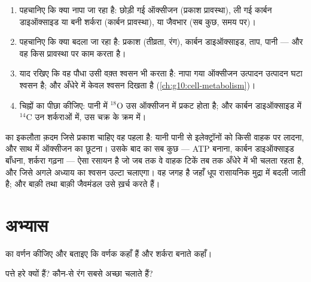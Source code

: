 \begin{method}[किसी प्रकाशसंश्लेषण प्रयोग पर तर्क करना]\label{met:g12:photosynthesis:experiment}
\begin{enumerate}
  \item पहचानिए कि क्या नापा जा रहा है: छोड़ी गई ऑक्सीजन (प्रकाश प्रावस्था),
        ली गई कार्बन डाइऑक्साइड या बनी शर्करा (कार्बन प्रावस्था), या
        जैवभार (सब कुछ, समय पर)।
  \item पहचानिए कि क्या बदला जा रहा है: प्रकाश (तीव्रता, रंग), कार्बन
        डाइऑक्साइड, ताप, पानी --- और वह किस प्रावस्था पर काम करता है।
  \item याद रखिए कि वह पौधा उसी वक़्त श्वसन भी करता है: नापा गया ऑक्सीजन
        उत्पादन उत्पादन घटा श्वसन है; और अँधेरे में केवल श्वसन दिखता है
        (\cref{ch:g10:cell-metabolism})।
  \item चिह्नों का पीछा कीजिए: पानी में $^{18}$O उस ऑक्सीजन में प्रकट होता
        है; और कार्बन डाइऑक्साइड में $^{14}$C उन शर्कराओं में, उस चक्र के
        क्रम में।
\end{enumerate}
\end{method}

\begin{remark}[प्रकाश, और फिर रसायन]\label{rem:g12:photosynthesis:light}
 का इकलौता क़दम जिसे प्रकाश चाहिए वह पहला है: यानी पानी से
इलेक्ट्रॉनों को किसी वाहक पर लादना, और साथ में ऑक्सीजन का छूटना। उसके बाद
का सब कुछ --- ATP बनाना, कार्बन डाइऑक्साइड बाँधना, शर्करा गढ़ना --- ऐसा
रसायन है जो जब तक वे वाहक टिकें तब तक अँधेरे में भी चलता रहता है, और जिसे
अगले अध्याय का श्वसन उल्टा चलाएगा।  वह जगह है जहाँ धूप रासायनिक मुद्रा
में बदली जाती है; और बाक़ी  तथा बाक़ी जैवमंडल उसे ख़र्च करते हैं।
\end{remark}

\section{अभ्यास}

\begin{exercise}[$\star$]\label{exo:g12:photosynthesis:1}
 का वर्णन कीजिए और बताइए कि वर्णक कहाँ हैं और शर्करा बनाते 
कहाँ।
\end{exercise}

\begin{exercise}[$\star$]\label{exo:g12:photosynthesis:2}
पत्ते हरे क्यों हैं? कौन-से रंग  सबसे अच्छा चलाते हैं?
\end{exercise}

